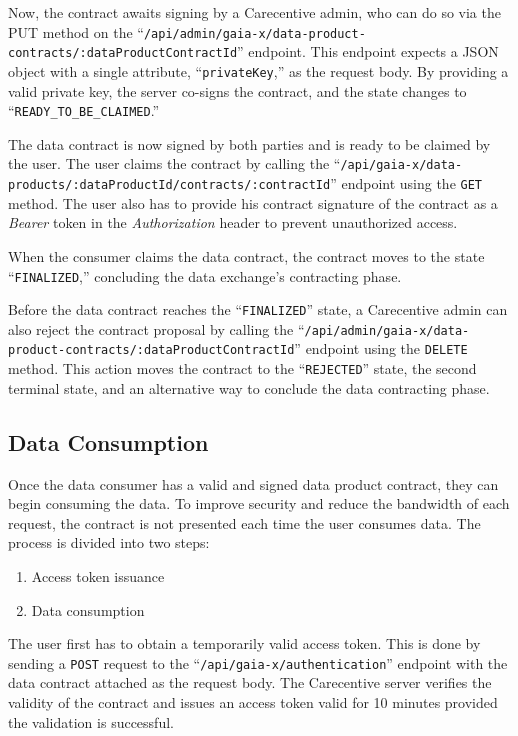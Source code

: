 Now, the contract awaits signing by a Carecentive admin, who can do so via the PUT method on the ``\texttt{/api\-/admin\-/gaia-x\-/data-product-contracts\-/:dataProductContractId}'' endpoint.
This endpoint expects a JSON object with a single attribute, ``\texttt{privateKey},'' as the request body.
By providing a valid private key, the server co-signs the contract, and the state changes to ``\texttt{READY\_TO\_BE\_CLAIMED}.''

The data contract is now signed by both parties and is ready to be claimed by the user.
The user claims the contract by calling the ``\texttt{/api\-/gaia-x\-/data-products\-/:dataProductId\-/contracts\-/:contractId}'' endpoint using the \texttt{GET} method.
The user also has to provide his contract signature of the contract as a \textit{Bearer} token in the \textit{Authorization} header to prevent unauthorized access.

When the consumer claims the data contract, the contract moves to the state ``\texttt{FINALIZED},'' concluding the data exchange's contracting phase.

Before the data contract reaches the ``\texttt{FINALIZED}'' state, a Carecentive admin can also reject the contract proposal by calling the ``\texttt{/api\-/admin\-/gaia-x\-/data-product\--contracts\-/:dataProduct\-ContractId}'' endpoint using the \texttt{DELETE} method.
This action moves the contract to the ``\texttt{REJEC\-TED}'' state, the second terminal state, and an alternative way to conclude the data contracting phase.

\subsection{Data Consumption}\label{subsec:data-consumption}

Once the data consumer has a valid and signed data product contract, they can begin consuming the data.
To improve security and reduce the bandwidth of each request, the contract is not presented each time the user consumes data.
The process is divided into two steps:
\begin{enumerate}
    \item Access token issuance
    \item Data consumption
\end{enumerate}

The user first has to obtain a temporarily valid access token.
This is done by sending a \texttt{POST} request to the ``\texttt{/api\-/gaia-x\-/authentication}'' endpoint with the data contract attached as the request body.
The Carecentive server verifies the validity of the contract and issues an access token valid for 10 minutes provided the validation is successful.

